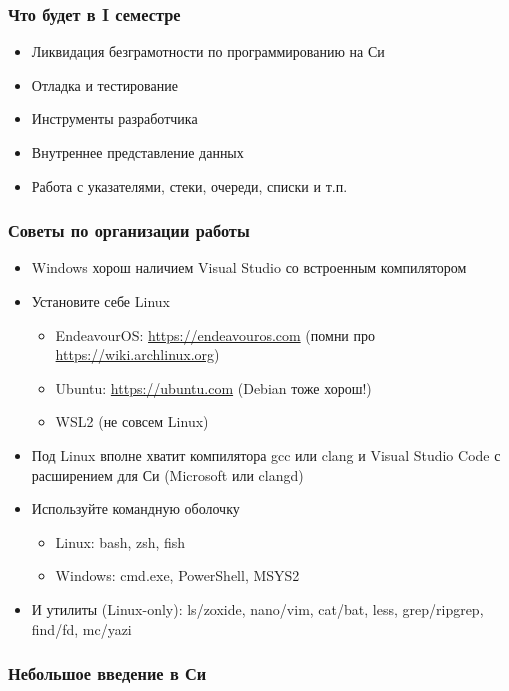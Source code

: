 \documentclass[aspectratio=169]{beamer}
\begin{document}
\begin{frame}
    \frametitle{Что будет в I семестре}
    \begin{itemize}
        \item Ликвидация безграмотности по программированию на Си
        \item Отладка и тестирование
        \item Инструменты разработчика
        \item Внутреннее представление данных
        \item Работа с указателями, стеки, очереди, списки и т.п.
    \end{itemize}
\end{frame}

\begin{frame}
    \frametitle{Советы по организации работы}

    \begin{itemize}
        \item Windows хорош наличием Visual Studio со встроенным компилятором
        \item Установите себе Linux
              \begin{itemize}
                  \item EndeavourOS: \url{https://endeavouros.com} (помни про \url{https://wiki.archlinux.org})
                  \item Ubuntu: \url{https://ubuntu.com} (Debian тоже хорош!)
                  \item WSL2 (не совсем Linux)
              \end{itemize}
        \item Под Linux вполне хватит компилятора gcc или clang и Visual Studio Code с расширением для Си (Microsoft или clangd)
        \item Используйте командную оболочку
              \begin{itemize}
                  \item Linux: bash, zsh, fish
                  \item Windows: cmd.exe, PowerShell, MSYS2
              \end{itemize}
        \item И утилиты (Linux-only): ls/zoxide, nano/vim, cat/bat, less, grep/ripgrep, find/fd, mc/yazi
    \end{itemize}

\end{frame}

\begin{frame}
    \frametitle{Небольшое введение в Си}

    \inputminted{c}{01_basic_c.c}

\end{frame}
\end{document}
